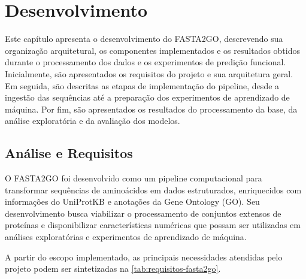 
\section{Desenvolvimento}
\label{sec:desenvolvimento}

Este capítulo apresenta o desenvolvimento do FASTA2GO, descrevendo sua organização arquitetural, os componentes implementados e os resultados obtidos durante o processamento dos dados e os experimentos de predição funcional. Inicialmente, são apresentados os requisitos do projeto e sua arquitetura geral. Em seguida, são descritas as etapas de implementação do pipeline, desde a ingestão das sequências até a preparação dos experimentos de aprendizado de máquina. Por fim, são apresentados os resultados do processamento da base, da análise exploratória e da avaliação dos modelos.



\subsection{Análise e Requisitos}
\label{sec:analise-e-requisitos}

O FASTA2GO foi desenvolvido como um pipeline computacional para transformar sequências de aminoácidos em dados estruturados, enriquecidos com informações do UniProtKB e anotações da Gene Ontology (GO). Seu desenvolvimento busca viabilizar o processamento de conjuntos extensos de proteínas e disponibilizar características numéricas que possam ser utilizadas em análises exploratórias e experimentos de aprendizado de máquina.

A partir do escopo implementado, as principais necessidades atendidas pelo projeto podem ser sintetizadas na \autoref{tab:requisitos-fasta2go}.

